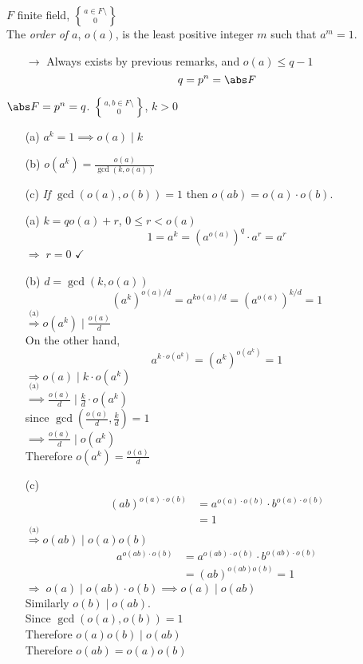  $F$ finite field, $a\in F\setminus\brace0$ \\
The \emph{order of $a$}, $o(a)$, is the least positive integer $m$ such that $a^m=1$.
\begin{itemize}
\item[$\to$] Always exists by previous remarks, and $o(a)\leq q-1$
\[ q = p^n = \abs F \]
\end{itemize}
\lem $\abs F=p^n=q$. $a,b\in F\setminus\brace0$, $k>0$
\begin{enumerate}
\item[(a)] $a^k=1 \implies o(a)\mid k$
\item[(b)] $o(a^k) = \frac{o(a)}{\gcd(k,o(a))}$
\item[(c)] \emph{If} $\gcd(o(a),o(b))=1$ then $o(ab)=o(a)\cdot o(b)$.
\end{enumerate}
\pf
\begin{enumerate}
\item[(a)] $k=qo(a)+r$, $0\leq r<o(a)$
\[ 1 = a^k = (a^{o(a)})^q\cdot a^r = a^r \]
$\Longrightarrow\; r=0$ $\checkmark$
\item[(b)] $d=\gcd(k,o(a))$
\[ (a^k)^{o(a)/d} = a^{ko(a)/d} = (a^{o(a)})^{k/d} = 1 \]
$\overset{\text{(a)}}{\Longrightarrow} o(a^k)\mid \frac{o(a)}{d}$ \\
On the other hand,
\[ a^{k\cdot o(a^k)} = (a^k)^{o(a^k)} = 1 \]
$\underset{\text{(a)}}\Longrightarrow o(a)\mid k\cdot o(a^k)$ \\
$\implies \frac{o(a)}{d} \mid \frac{k}{d}\cdot o(a^k)$ \\
since $\gcd(\frac{o(a)}{d},\frac{k}{d})=1$ \\
$\implies \frac{o(a)}{d} \mid o(a^k)$ \\
Therefore $o(a^k)=\frac{o(a)}{d}$
\item[(c)] \begin{align*}
(ab)^{o(a)\cdot o(b)} &= a^{o(a)\cdot o(b)} \cdot b^{o(a)\cdot o(b)} \\
&= 1
\end{align*}
$\overset{\text{(a)}}\Longrightarrow o(ab)\mid o(a)o(b)$
\begin{align*}
a^{o(ab)\cdot o(b)} &= a^{o(ab)\cdot o(b)}\cdot b^{o(ab)\cdot o(b)} \\
&= (ab)^{o(ab)o(b)} = 1
\end{align*}
$\Longrightarrow\; o(a)\mid o(ab)\cdot o(b) \implies o(a)\mid o(ab)$ \\
Similarly $o(b)\mid o(ab)$. \\
Since $\gcd(o(a),o(b))=1$ \\
Therefore $o(a)o(b)\mid o(ab)$ \\
Therefore $o(ab)=o(a)o(b)$
\end{enumerate}
